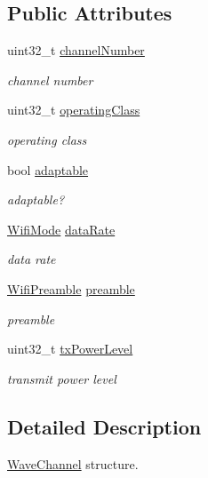 \subsection*{Public Attributes}
\begin{DoxyCompactItemize}
\item 
uint32\+\_\+t \hyperlink{structns3_1_1ChannelManager_1_1WaveChannel_a78854f9258142c492ac15f842f74fa73}{channel\+Number}
\begin{DoxyCompactList}\small\item\em channel number \end{DoxyCompactList}\item 
uint32\+\_\+t \hyperlink{structns3_1_1ChannelManager_1_1WaveChannel_a66ab0c77b9081e4fa30aca81429cd8a8}{operating\+Class}
\begin{DoxyCompactList}\small\item\em operating class \end{DoxyCompactList}\item 
bool \hyperlink{structns3_1_1ChannelManager_1_1WaveChannel_ae1903f2249f14c22639043ce06956623}{adaptable}
\begin{DoxyCompactList}\small\item\em adaptable? \end{DoxyCompactList}\item 
\hyperlink{classns3_1_1WifiMode}{Wifi\+Mode} \hyperlink{structns3_1_1ChannelManager_1_1WaveChannel_a7738dfbc7f86553e8609d49230a43ec5}{data\+Rate}
\begin{DoxyCompactList}\small\item\em data rate \end{DoxyCompactList}\item 
\hyperlink{group__wifi_ga5e94a56cb338a14ffbbb19c6a41251eb}{Wifi\+Preamble} \hyperlink{structns3_1_1ChannelManager_1_1WaveChannel_ab3ded83e7113e054b5cce6f4ae6b08e0}{preamble}
\begin{DoxyCompactList}\small\item\em preamble \end{DoxyCompactList}\item 
uint32\+\_\+t \hyperlink{structns3_1_1ChannelManager_1_1WaveChannel_aea9e96ab742faa58de5ed912f88c5691}{tx\+Power\+Level}
\begin{DoxyCompactList}\small\item\em transmit power level \end{DoxyCompactList}\end{DoxyCompactItemize}


\subsection{Detailed Description}
\hyperlink{structns3_1_1ChannelManager_1_1WaveChannel}{Wave\+Channel} structure. 

